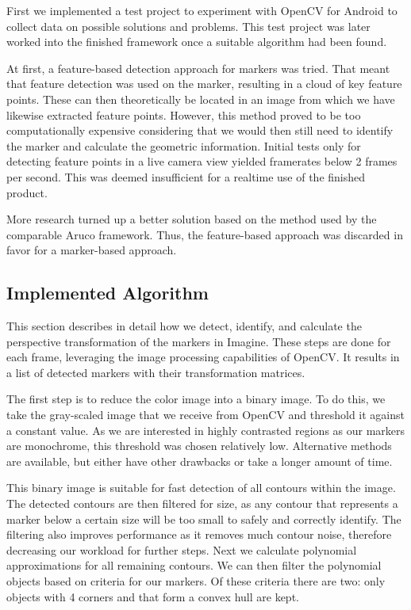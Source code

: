 First we implemented a test project to experiment with OpenCV for Android to collect data on possible solutions and problems.
This test project was later worked into the finished framework once a suitable algorithm had been found.

At first, a feature-based detection approach for markers was tried.
That meant that feature detection was used on the marker, resulting in a cloud of key feature points.
These can then theoretically be located in an image from which we have likewise extracted feature points.
However, this method proved to be too computationally expensive considering that we would then still need to identify the marker and calculate the geometric information.
Initial tests only for detecting feature points in a live camera view yielded framerates below 2 frames per second.
This was deemed insufficient for a realtime use of the finished product.

More research turned up a better solution based on the method used by the comparable Aruco\cite{aruco} framework.
Thus, the feature-based approach was discarded in favor for a marker-based approach.

\subsection{Implemented Algorithm}
\label{detection_workflow}

This section describes in detail how we detect, identify, and calculate the perspective transformation of the markers in Imagine.
These steps are done for each frame, leveraging the image processing capabilities of OpenCV.
It results in a list of detected markers with their transformation matrices.

The first step is to reduce the color image into a binary image.
To do this, we take the gray-scaled image that we receive from OpenCV and threshold it against a constant value.
As we are interested in highly contrasted regions as our markers are monochrome, this threshold was chosen relatively low.
Alternative methods are available, but either have other drawbacks or take a longer amount of time.

This binary image is suitable for fast detection of all contours within the image.
The detected contours are then filtered for size, as any contour that represents a marker below a certain size will be too small to safely and correctly identify.
The filtering also improves performance as it removes much contour noise, therefore decreasing our workload for further steps.
Next we calculate polynomial approximations for all remaining contours.
We can then filter the polynomial objects based on criteria for our markers.
Of these criteria there are two: only objects with 4 corners and that form a convex hull are kept.

